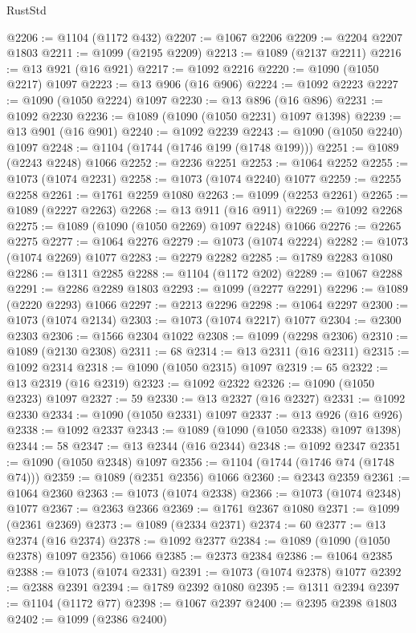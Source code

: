 \begin{lexlean}{RustStd}
\begin{coremodule}
@2206 := @1104 (@1172 @432)
@2207 := @1067 @2206
@2209 := @2204 @2207 @1803
@2211 := @1099 (@2195 @2209)
@2213 := @1089 (@2137 @2211)
@2216 := @13 @921 (@16 @921)
@2217 := @1092 @2216
@2220 := @1090 (@1050 @2217) @1097
@2223 := @13 @906 (@16 @906)
@2224 := @1092 @2223
@2227 := @1090 (@1050 @2224) @1097
@2230 := @13 @896 (@16 @896)
@2231 := @1092 @2230
@2236 := @1089 (@1090 (@1050 @2231) @1097 @1398)
@2239 := @13 @901 (@16 @901)
@2240 := @1092 @2239
@2243 := @1090 (@1050 @2240) @1097
@2248 := @1104 (@1744 (@1746 @199 (@1748 @199)))
@2251 := @1089 (@2243 @2248) @1066
@2252 := @2236 @2251
@2253 := @1064 @2252
@2255 := @1073 (@1074 @2231)
@2258 := @1073 (@1074 @2240) @1077
@2259 := @2255 @2258
@2261 := @1761 @2259 @1080
@2263 := @1099 (@2253 @2261)
@2265 := @1089 (@2227 @2263)
@2268 := @13 @911 (@16 @911)
@2269 := @1092 @2268
@2275 := @1089 (@1090 (@1050 @2269) @1097 @2248) @1066
@2276 := @2265 @2275
@2277 := @1064 @2276
@2279 := @1073 (@1074 @2224)
@2282 := @1073 (@1074 @2269) @1077
@2283 := @2279 @2282
@2285 := @1789 @2283 @1080
@2286 := @1311 @2285
@2288 := @1104 (@1172 @202)
@2289 := @1067 @2288
@2291 := @2286 @2289 @1803
@2293 := @1099 (@2277 @2291)
@2296 := @1089 (@2220 @2293) @1066
@2297 := @2213 @2296
@2298 := @1064 @2297
@2300 := @1073 (@1074 @2134)
@2303 := @1073 (@1074 @2217) @1077
@2304 := @2300 @2303
@2306 := @1566 @2304 @1022
@2308 := @1099 (@2298 @2306)
@2310 := @1089 (@2130 @2308)
@2311 := 68
@2314 := @13 @2311 (@16 @2311)
@2315 := @1092 @2314
@2318 := @1090 (@1050 @2315) @1097
@2319 := 65
@2322 := @13 @2319 (@16 @2319)
@2323 := @1092 @2322
@2326 := @1090 (@1050 @2323) @1097
@2327 := 59
@2330 := @13 @2327 (@16 @2327)
@2331 := @1092 @2330
@2334 := @1090 (@1050 @2331) @1097
@2337 := @13 @926 (@16 @926)
@2338 := @1092 @2337
@2343 := @1089 (@1090 (@1050 @2338) @1097 @1398)
@2344 := 58
@2347 := @13 @2344 (@16 @2344)
@2348 := @1092 @2347
@2351 := @1090 (@1050 @2348) @1097
@2356 := @1104 (@1744 (@1746 @74 (@1748 @74)))
@2359 := @1089 (@2351 @2356) @1066
@2360 := @2343 @2359
@2361 := @1064 @2360
@2363 := @1073 (@1074 @2338)
@2366 := @1073 (@1074 @2348) @1077
@2367 := @2363 @2366
@2369 := @1761 @2367 @1080
@2371 := @1099 (@2361 @2369)
@2373 := @1089 (@2334 @2371)
@2374 := 60
@2377 := @13 @2374 (@16 @2374)
@2378 := @1092 @2377
@2384 := @1089 (@1090 (@1050 @2378) @1097 @2356) @1066
@2385 := @2373 @2384
@2386 := @1064 @2385
@2388 := @1073 (@1074 @2331)
@2391 := @1073 (@1074 @2378) @1077
@2392 := @2388 @2391
@2394 := @1789 @2392 @1080
@2395 := @1311 @2394
@2397 := @1104 (@1172 @77)
@2398 := @1067 @2397
@2400 := @2395 @2398 @1803
@2402 := @1099 (@2386 @2400)

\end{coremodule}
\end{lexlean}
